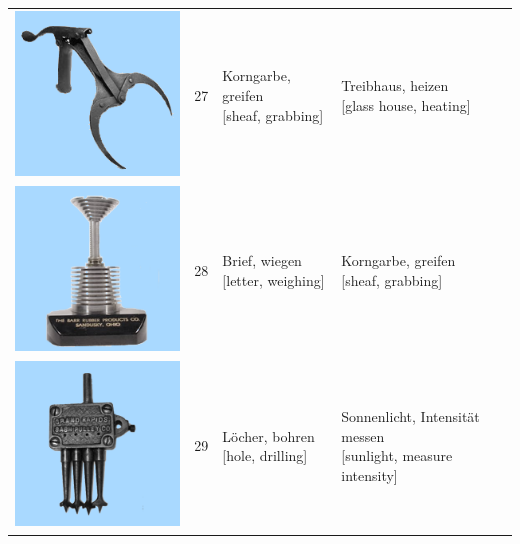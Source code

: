 \documentclass[
  english,
  man,floatsintext]{apa7}
\begin{document}
\begin{center}
\begin{ThreePartTable}
{\begin{longtable}{llll}
\includegraphics[valign=c, scale=0.23]{../materials/unfamiliar/27.png} & 27 & \makecell[l]{Korngarbe, greifen\\{[sheaf, grabbing]}} & \makecell[l]{Treibhaus, heizen\\{[glass house, heating]}}\\
\includegraphics[valign=c, scale=0.23]{../materials/unfamiliar/28.png} & 28 & \makecell[l]{Brief, wiegen\\{[letter, weighing]}} & \makecell[l]{Korngarbe, greifen\\{[sheaf, grabbing]}}\\
\includegraphics[valign=c, scale=0.23]{../materials/unfamiliar/29.png} & 29 & \makecell[l]{Löcher, bohren\\{[hole, drilling]}} & \makecell[l]{Sonnenlicht, Intensität messen\\{[sunlight, measure intensity]}}\\

\end{longtable}}
\end{ThreePartTable}
\end{center}
\end{document}
